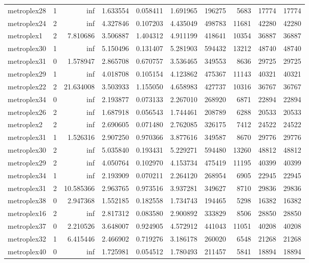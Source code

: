 \begin{longtable}{|l|r|r|r|r|r|r|r|r|r|}
metroplex28 & 1 & inf & 1.633554 & 0.058411 & 1.691965 & 196275 & 5683 & 17774 & 17774 \\
metroplex24 & 2 & inf & 4.327846 & 0.107203 & 4.435049 & 498783 & 11681 & 42280 & 42280 \\
metroplex1 & 2 & 7.810686 & 3.506887 & 1.404312 & 4.911199 & 418641 & 10354 & 36887 & 36887 \\
metroplex30 & 1 & inf & 5.150496 & 0.131407 & 5.281903 & 594432 & 13212 & 48740 & 48740 \\
metroplex31 & 0 & 1.578947 & 2.865708 & 0.670757 & 3.536465 & 349553 & 8636 & 29725 & 29725 \\
metroplex29 & 1 & inf & 4.018708 & 0.105154 & 4.123862 & 475367 & 11143 & 40321 & 40321 \\
metroplex22 & 2 & 21.634008 & 3.503933 & 1.155050 & 4.658983 & 427737 & 10316 & 36767 & 36767 \\
metroplex34 & 0 & inf & 2.193877 & 0.073133 & 2.267010 & 268920 & 6871 & 22894 & 22894 \\
metroplex26 & 2 & inf & 1.687918 & 0.056543 & 1.744461 & 208789 & 6288 & 20533 & 20533 \\
metroplex2 & 2 & inf & 2.690605 & 0.071480 & 2.762085 & 326175 & 7412 & 24522 & 24522 \\
metroplex31 & 1 & 1.526316 & 2.907250 & 0.970366 & 3.877616 & 349587 & 8670 & 29776 & 29776 \\
metroplex30 & 2 & inf & 5.035840 & 0.193431 & 5.229271 & 594480 & 13260 & 48812 & 48812 \\
metroplex29 & 2 & inf & 4.050764 & 0.102970 & 4.153734 & 475419 & 11195 & 40399 & 40399 \\
metroplex34 & 1 & inf & 2.193909 & 0.070211 & 2.264120 & 268954 & 6905 & 22945 & 22945 \\
metroplex31 & 2 & 10.585366 & 2.963765 & 0.973516 & 3.937281 & 349627 & 8710 & 29836 & 29836 \\
metroplex38 & 0 & 2.947368 & 1.552185 & 0.182558 & 1.734743 & 194465 & 5298 & 16382 & 16382 \\
metroplex16 & 2 & inf & 2.817312 & 0.083580 & 2.900892 & 333829 & 8506 & 28850 & 28850 \\
metroplex37 & 0 & 2.210526 & 3.648007 & 0.924905 & 4.572912 & 441043 & 11051 & 40208 & 40208 \\
metroplex32 & 1 & 6.415446 & 2.466902 & 0.719276 & 3.186178 & 260020 & 6548 & 21268 & 21268 \\
metroplex40 & 0 & inf & 1.725981 & 0.054512 & 1.780493 & 211457 & 5841 & 18894 & 18894 \\

\end{longtable}
